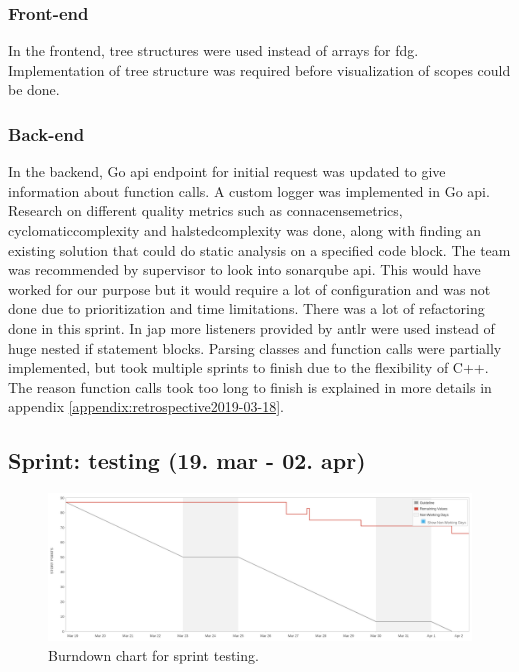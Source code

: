 \subsubsection{Front-end}
In the \gls{frontend}, tree structures were used instead of arrays for \gls{fdg}. Implementation of tree structure was required before visualization of scopes could be done.
\subsubsection{Back-end}
In the \gls{backend}, Go \gls{api} endpoint for initial request was updated to give information about function calls. A custom logger was implemented in Go \gls{api}. Research on different quality metrics such as \Gls{connacensemetrics}, \Gls{cyclomaticcomplexity} and \Gls{halstedcomplexity} was done, along with finding an existing solution that could do static analysis on a specified code block. The team was recommended by supervisor to look into \gls{sonarqube} \gls{api}. This would have worked for our purpose but it would require a lot of configuration and was not done due to prioritization and time limitations. 
There was a lot of refactoring done in this \gls{sprint}. In \gls{jap} more listeners provided by \gls{antlr} were used instead of huge nested if statement blocks.  Parsing classes and function calls were partially implemented, but took multiple \glspl{sprint} to finish due to the flexibility of C++. The reason function calls took too long to finish is explained in more details in appendix \ref{appendix:retrospective2019-03-18}.

\subsection{Sprint: testing (19. mar - 02. apr)}
\begin{figure}[H] 
    \includegraphics[width=\textwidth]{inc/images/sprints/sprintTest190319-020419.png}
    \caption{Burndown chart for sprint testing.}
    \label{fig:sprintTesting}
\end{figure}

